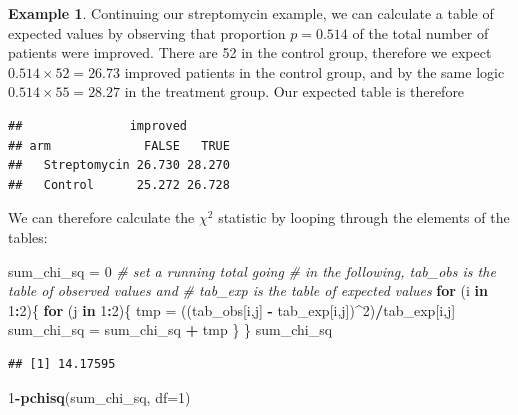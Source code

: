 \documentclass[
  openany]{book}
\newenvironment{Shaded}{\begin{snugshade}}{\end{snugshade}}
\newcommand{\AttributeTok}[1]{\textcolor[rgb]{0.13,0.29,0.53}{#1}}
\newcommand{\CommentTok}[1]{\textcolor[rgb]{0.56,0.35,0.01}{\textit{#1}}}
\newcommand{\ControlFlowTok}[1]{\textcolor[rgb]{0.13,0.29,0.53}{\textbf{#1}}}
\newcommand{\DecValTok}[1]{\textcolor[rgb]{0.00,0.00,0.81}{#1}}
\newcommand{\FunctionTok}[1]{\textcolor[rgb]{0.13,0.29,0.53}{\textbf{#1}}}
\newcommand{\NormalTok}[1]{#1}
\newcommand{\OtherTok}[1]{\textcolor[rgb]{0.56,0.35,0.01}{#1}}
\newcommand{\SpecialCharTok}[1]{\textcolor[rgb]{0.81,0.36,0.00}{\textbf{#1}}}
\theoremstyle{definition}
\theoremstyle{definition}
\newtheorem{example}{Example}[chapter]
\theoremstyle{definition}
\theoremstyle{definition}
\theoremstyle{remark}
\begin{document}
\begin{example}

Continuing our streptomycin example, we can calculate a table of expected values by observing that proportion \(p=0.514\) of the total number of patients were improved. There are 52 in the control group, therefore we expect \(0.514\times 52 = 26.73\) improved patients in the control group, and by the same logic \(0.514\times 55 = 28.27\) in the treatment group. Our expected table is therefore

\begin{verbatim}
##               improved
## arm             FALSE   TRUE
##   Streptomycin 26.730 28.270
##   Control      25.272 26.728
\end{verbatim}

We can therefore calculate the \(\chi^2\) statistic by looping through the elements of the tables:

\begin{Shaded}
\begin{Highlighting}[]
\NormalTok{sum\_chi\_sq }\OtherTok{=} \DecValTok{0} \CommentTok{\# set a running total going }
\CommentTok{\# in the following, tab\_obs is the table of observed values and}
\CommentTok{\# tab\_exp is the table of expected values}
\ControlFlowTok{for}\NormalTok{ (i }\ControlFlowTok{in} \DecValTok{1}\SpecialCharTok{:}\DecValTok{2}\NormalTok{)\{}
  \ControlFlowTok{for}\NormalTok{ (j }\ControlFlowTok{in} \DecValTok{1}\SpecialCharTok{:}\DecValTok{2}\NormalTok{)\{}
\NormalTok{    tmp }\OtherTok{=}\NormalTok{ ((tab\_obs[i,j] }\SpecialCharTok{{-}}\NormalTok{ tab\_exp[i,j])}\SpecialCharTok{\^{}}\DecValTok{2}\NormalTok{)}\SpecialCharTok{/}\NormalTok{tab\_exp[i,j]}
\NormalTok{    sum\_chi\_sq }\OtherTok{=}\NormalTok{ sum\_chi\_sq }\SpecialCharTok{+}\NormalTok{ tmp}
\NormalTok{  \}}
\NormalTok{\}}
\NormalTok{sum\_chi\_sq}
\end{Highlighting}
\end{Shaded}

\begin{verbatim}
## [1] 14.17595
\end{verbatim}

\begin{Shaded}
\begin{Highlighting}[]
\DecValTok{1}\SpecialCharTok{{-}}\FunctionTok{pchisq}\NormalTok{(sum\_chi\_sq, }\AttributeTok{df=}\DecValTok{1}\NormalTok{)}
\end{Highlighting}
\end{Shaded}


\end{example}
\end{document}
